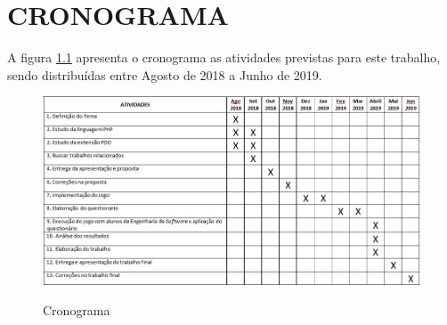 \chapter{CRONOGRAMA}
\label{chap:cronograma}
A figura \ref{fig:figura-cronograma} apresenta o cronograma as atividades previstas para este trabalho, sendo distribuídas entre Agosto de 2018 a Junho de 2019.

\begin{figure}[!htb]
    \centering
    \caption{Cronograma}
    \includegraphics[width=1\textwidth]{./dados/figuras/cronogramaTCC}
    \label{fig:figura-cronograma}
\end{figure}